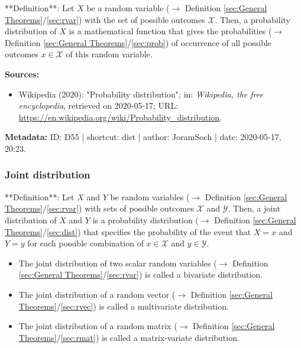 \documentclass[a4paper,12pt,twoside]{book}
\begin{document}
**Definition**: Let $X$ be a random variable ($\rightarrow$ Definition \ref{sec:General Theorems}/\ref{sec:rvar}) with the set of possible outcomes $\mathcal{X}$. Then, a probability distribution of $X$ is a mathematical function that gives the probabilities ($\rightarrow$ Definition \ref{sec:General Theorems}/\ref{sec:prob}) of occurrence of all possible outcomes $x \in \mathcal{X}$ of this random variable.


\vspace{1em}
\textbf{Sources:}
\begin{itemize}
\item Wikipedia (2020): "Probability distribution"; in: \textit{Wikipedia, the free encyclopedia}, retrieved on 2020-05-17; URL: \url{https://en.wikipedia.org/wiki/Probability_distribution}.
\end{itemize}


\vspace{1em}
\textbf{Metadata:} ID: D55 | shortcut: dist | author: JoramSoch | date: 2020-05-17, 20:23.
\vspace{1em}



\subsubsection[\textit{Joint distribution}]{Joint distribution} \label{sec:dist-joint}
\setcounter{equation}{0}

**Definition**: Let $X$ and $Y$ be random variables ($\rightarrow$ Definition \ref{sec:General Theorems}/\ref{sec:rvar}) with sets of possible outcomes $\mathcal{X}$ and $\mathcal{Y}$. Then, a joint distribution of $X$ and $Y$ is a probability distribution ($\rightarrow$ Definition \ref{sec:General Theorems}/\ref{sec:dist}) that specifies the probability of the event that $X = x$ and $Y = y$ for each possible combination of $x \in \mathcal{X}$ and $y \in \mathcal{Y}$.

\begin{itemize}

\item The joint distribution of two scalar random variables ($\rightarrow$ Definition \ref{sec:General Theorems}/\ref{sec:rvar}) is called a bivariate distribution.

\item The joint distribution of a random vector ($\rightarrow$ Definition \ref{sec:General Theorems}/\ref{sec:rvec}) is called a multivariate distribution.

\item The joint distribution of a random matrix ($\rightarrow$ Definition \ref{sec:General Theorems}/\ref{sec:rmat}) is called a matrix-variate distribution.

\end{itemize}
\end{document}
